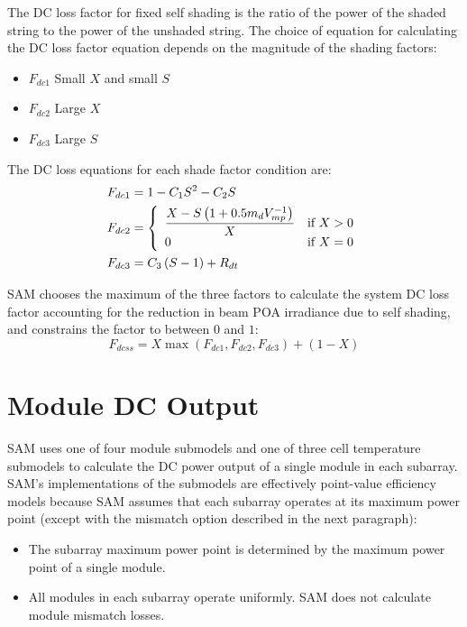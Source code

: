 \documentclass[12pt,letterpaper]{article}
\begin{document}
The DC loss factor for fixed self shading is the ratio of the power of the shaded string to the power of the unshaded string. The choice of equation for calculating the DC loss factor equation depends on the magnitude of the shading factors:
\begin{itemize}
\item $F_{dc1}$ \quad Small $X$ and small $S$
\item $F_{dc2}$ \quad Large $X$
\item $F_{dc3}$ \quad Large $S$
\end{itemize}

The DC loss equations for each shade factor condition are:
\begin{align}
F_{dc1} &= 1-C_1S^2-C_2S \notag\\ %
F_{dc2} &= 
\left\{
   \begin{array}{ll}
      \dfrac{X-S\left(1+0.5 m_d V^{-1}_{mp}\right)}{X} & \text{if $X>0$}\\
      0 & \text{if $X=0$}\\
   \end{array}
\right. \notag\\ %
F_{dc3} &= C_3\left(S-1\right)+R_{dt} %
\end{align}

SAM chooses the maximum of the three factors to calculate the system DC loss factor accounting for the reduction in beam POA irradiance due to self shading, and constrains the factor to between $0$ and $1$:
\begin{equation}\label{eqn-selfshadedcderate}
F_{dcss}=X\max\left(F_{dc1},F_{dc2},F_{dc3}\right)+(1-X)
\end{equation}

\chapter{Module DC Output}\label{sec-module}

SAM uses one of four module submodels and one of three cell temperature submodels to calculate the DC power output of a single module in each subarray.  SAM's implementations of the submodels are effectively point-value efficiency models because SAM assumes that each subarray operates at its maximum power point (except with the mismatch option described in the next paragraph):
\begin{itemize}
\item The subarray maximum power point is determined by the maximum power point of a single module.
\item All modules in each subarray operate uniformly. SAM does not calculate module mismatch losses.
\end{itemize}
\end{document}
